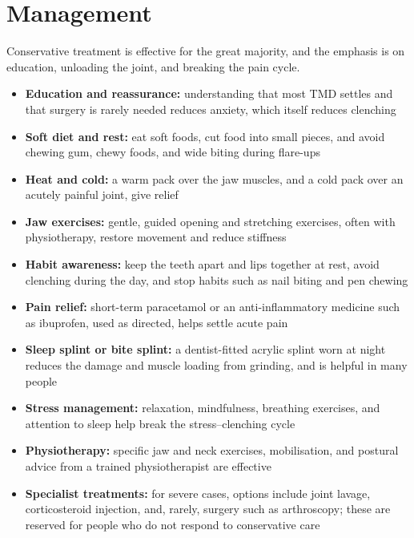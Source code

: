 \section*{Management}
Conservative treatment is effective for the great majority, and the emphasis is on education, unloading the joint, and breaking the pain cycle.

\begin{itemize}
    \item \textbf{Education and reassurance:} understanding that most TMD settles and that surgery is rarely needed reduces anxiety, which itself reduces clenching
    \item \textbf{Soft diet and rest:} eat soft foods, cut food into small pieces, and avoid chewing gum, chewy foods, and wide biting during flare-ups
    \item \textbf{Heat and cold:} a warm pack over the jaw muscles, and a cold pack over an acutely painful joint, give relief
    \item \textbf{Jaw exercises:} gentle, guided opening and stretching exercises, often with physiotherapy, restore movement and reduce stiffness
    \item \textbf{Habit awareness:} keep the teeth apart and lips together at rest, avoid clenching during the day, and stop habits such as nail biting and pen chewing
    \item \textbf{Pain relief:} short-term paracetamol or an anti-inflammatory medicine such as ibuprofen, used as directed, helps settle acute pain
    \item \textbf{Sleep splint or bite splint:} a dentist-fitted acrylic splint worn at night reduces the damage and muscle loading from grinding, and is helpful in many people
    \item \textbf{Stress management:} relaxation, mindfulness, breathing exercises, and attention to sleep help break the stress--clenching cycle
    \item \textbf{Physiotherapy:} specific jaw and neck exercises, mobilisation, and postural advice from a trained physiotherapist are effective
    \item \textbf{Specialist treatments:} for severe cases, options include joint lavage, corticosteroid injection, and, rarely, surgery such as arthroscopy; these are reserved for people who do not respond to conservative care
\end{itemize}


